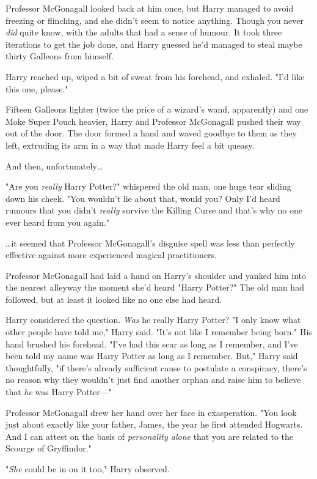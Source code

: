 Professor McGonagall looked back at him once, but Harry managed to avoid 
freezing or flinching, and she didn't seem to notice anything. Though you never 
\emph{did} quite know, with the adults that had a sense of humour. It took 
three iterations to get the job done, and Harry guessed he'd managed to steal 
maybe thirty Galleons from himself.

Harry reached up, wiped a bit of sweat from his forehead, and exhaled. "I'd 
like this one, please."

Fifteen Galleons lighter (twice the price of a wizard's wand, apparently) and 
one Moke Super Pouch  heavier, Harry and Professor McGonagall pushed their 
way out of the door. The door formed a hand and waved goodbye to them as they 
left, extruding its arm in a way that made Harry feel a bit queasy.

And then, unfortunately{\ldots}

"Are you \emph{really} Harry Potter?" whispered the old man, one huge tear 
sliding down his cheek. "You wouldn't lie about that, would you? Only I'd heard 
rumours that you didn't \emph{really} survive the Killing Curse and that's why 
no one ever heard from you again."

{\ldots}it seemed that Professor McGonagall's disguise spell was less than 
perfectly effective against more experienced magical practitioners.

Professor McGonagall had laid a hand on Harry's shoulder and yanked him into 
the nearest alleyway the moment she'd heard "Harry Potter?" The old man had 
followed, but at least it looked like no one else had heard.

Harry considered the question. \emph{Was} he really Harry Potter? "I only know 
what other people have told me," Harry said. "It's not like I remember being 
born." His hand brushed his forehead. "I've had this scar as long as I 
remember, and I've been told my name was Harry Potter as long as I remember. 
But," Harry said thoughtfully, "if there's already sufficient cause to 
postulate a conspiracy, there's no reason why they wouldn't just find another 
orphan and raise him to believe that \emph{he} was Harry Potter---"

Professor McGonagall drew her hand over her face in exasperation. "You look 
just about exactly like your father, James, the year he first attended 
Hogwarts. And I can attest on the basis of \emph{personality alone} that you 
are related to the Scourge of Gryffindor."

"\emph{She} could be in on it too," Harry observed.

